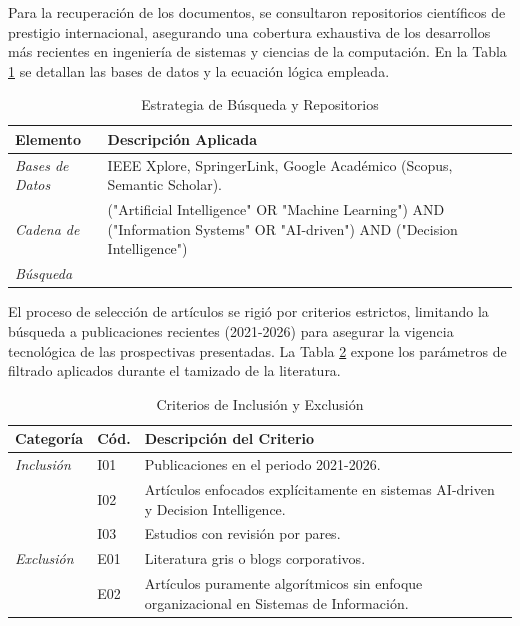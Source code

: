 \documentclass[conference]{IEEEtran}
\begin{document}
Para la recuperación de los documentos, se consultaron repositorios científicos de prestigio internacional, asegurando una cobertura exhaustiva de los desarrollos más recientes en ingeniería de sistemas y ciencias de la computación. En la Tabla \ref{tab:estrategia} se detallan las bases de datos y la ecuación lógica empleada.

\begin{table}[htbp]
\caption{Estrategia de Búsqueda y Repositorios}
\label{tab:estrategia}
\centering
\begin{tabular}{p{2.5cm} p{5cm}}
\toprule
\textbf{Elemento} & \textbf{Descripción Aplicada} \\
\midrule
\textit{Bases de Datos} & IEEE Xplore, SpringerLink, Google Académico (Scopus, Semantic Scholar). \\
\addlinespace
\textit{Cadena de} & ("Artificial Intelligence" OR "Machine Learning") AND ("Information Systems" OR "AI-driven") AND ("Decision Intelligence") \\
\textit{Búsqueda} & \\
\bottomrule
\end{tabular}
\end{table}

El proceso de selección de artículos se rigió por criterios estrictos, limitando la búsqueda a publicaciones recientes (2021-2026) para asegurar la vigencia tecnológica de las prospectivas presentadas. La Tabla \ref{tab:criterios} expone los parámetros de filtrado aplicados durante el tamizado de la literatura.

\begin{table}[htbp]
\caption{Criterios de Inclusión y Exclusión}
\label{tab:criterios}
\centering
\begin{tabular}{ll p{4.2cm}}
\toprule
\textbf{Categoría} & \textbf{Cód.} & \textbf{Descripción del Criterio} \\
\midrule
\textit{Inclusión} & I01 & Publicaciones en el periodo 2021-2026. \\
 & I02 & Artículos enfocados explícitamente en sistemas AI-driven y Decision Intelligence. \\
 & I03 & Estudios con revisión por pares. \\
\midrule
\textit{Exclusión} & E01 & Literatura gris o blogs corporativos. \\
 & E02 & Artículos puramente algorítmicos sin enfoque organizacional en Sistemas de Información. \\
\bottomrule
\end{tabular}
\end{table}
\end{document}
